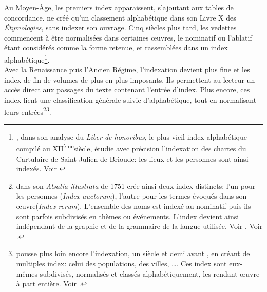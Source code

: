 Au Moyen-Âge, les premiers index apparaissent, s'ajoutant aux tables de concordance.  ne créé qu'un classement alphabétique dans son Livre X des \textit{Étymologies}, sans indexer son ouvrage. Cinq siècles plus tard, les vedettes commencent à être normalisées dans certaines œuvres, le nominatif ou l'ablatif étant considérés comme la forme retenue, et rassemblées dans un index alphabétique\footnote{, dans son analyse du \textit{Liber de honoribus}, le plus vieil index alphabétique compilé au \textsc{XII}\textsuperscript{ème}siècle, étudie avec précision l'indexation des chartes du Cartulaire de Saint-Julien de Brioude: les lieux et les personnes sont ainsi indexés. Voir \cite[pp.97 et suivantes]{berger_indexation_2006}}.\\

Avec la Renaissance puis l'Ancien Régime, l'indexation devient plus fine et les index de fin de volumes de plus en plus imposants. Ils permettent au lecteur un accès direct aux passages du texte contenant l'entrée d'index. Plus encore, ces index lient une classification générale suivie d'alphabétique, tout en normalisant leurs entrées\footnote{ dans son \textit{Alsatia illustrata} de 1751 crée ainsi deux index distincts: l'un pour les personnes (\textit{Index auctorum}), l'autre pour les termes évoqués dans son œuvre(\textit{Index rerum}). L'ensemble des noms est indexé au nominatif puis ils sont parfois subdivisés en thèmes ou événements. L'index devient ainsi indépendant de la graphie et de la grammaire de la langue utilisée. Voir \cite{schoepflin_alsatia_1751}. Voir .}\footnote{ pousse plus loin encore l'indexation, un siècle et demi avant , en créant de multiples index: celui des populations, des villes, \dots. Ces index sont eux-mêmes subdivisés, normalisés et classés alphabétiquement, les rendant œuvre à part entière. Voir \cite{estienne_thesaurus_1573}.}.